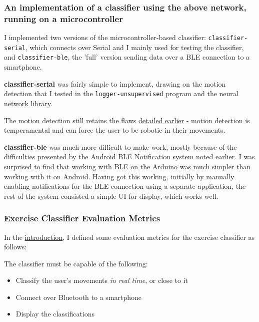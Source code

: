 \documentclass[a4paper]{article}
\begin{document}
\subsubsection{An implementation of a classifier using the above network, running on a microcontroller}

I implemented two versions of the microcontroller-based classifier: \lstinline{classifier-serial}, which connects over Serial and I mainly used for testing the classifier, and \lstinline{classifier-ble}, the 'full' version sending data over a BLE connection to a smartphone.

\textbf{classifier-serial} was fairly simple to implement, drawing on the motion detection that I tested in the \lstinline{logger-unsupervised} program and the neural network library.

The motion detection still retains the flaws \hyperref[para:ev_cl_loggerunsupervised]{detailed earlier} - motion detection is temperamental and can force the user to be robotic in their movements.

\label{para:ev_cl_classifierble}
\textbf{classifier-ble} was much more difficult to make work, mostly because of the difficulties presented by the Android BLE Notification system \hyperref[para:ev_cl_loggerble]{noted earlier.
}I was surprised to find that working with BLE on the Arduino was much simpler than working with it on Android. Having got this working, initially by manually enabling notifications for the BLE connection using a separate application, the rest of the system consisted a simple UI for display, which works well. 

\subsubsection{Exercise Classifier Evaluation Metrics}

In the \hyperref[subsubsec:in_cs_ecmetrics]{introduction}, I defined some evaluation metrics for the exercise classifier as follows:

The classifier must be capable of the following:

\begin{itemize}
\item Classify the user's movements \textit{in real time}, or close to it
\item Connect over Bluetooth to a smartphone
\item Display the classifications
\end{itemize}
\end{document}

